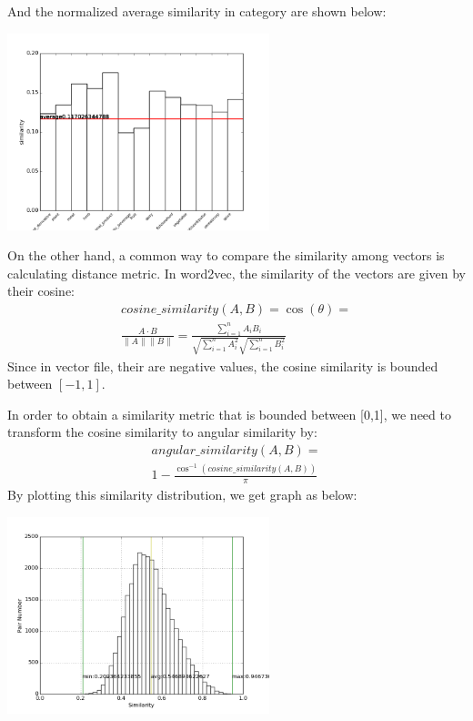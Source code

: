 \documentclass[12pt]{report}
\begin{document}
\begin{multicols}{2}
And the normalized average similarity in category are shown below:

\begin{center}
\includegraphics[width=3in]{normalized_similarity_by_category.png}
\end{center}

On the other hand, a common way to compare the similarity among vectors is calculating distance metric. In word2vec, the similarity of the vectors are given by their cosine:
\begin{equation}
\begin{split}
cosine\_similarity(A,B) = \cos(\theta) = \\
\frac{A \cdot B}{\|A\|\|B\|} = \frac{\sum_{i=1}^{n}A_iB_i}{\sqrt{\sum_{i=1}^{n}A_i^2}\sqrt{\sum_{i=1}^{n}B_i^2}}
\end{split}
\end{equation}
Since in vector file, their are negative values, the cosine similarity is bounded between $[-1,1]$. 

In order to obtain a similarity metric that is bounded between [0,1], we need to transform the cosine similarity to angular similarity by:
\begin{equation}
\begin{split}
angular\_similarity(A,B) = \\
1- \frac{\cos^{-1}(cosine\_similarity(A,B))}{\pi}
\end{split}
\end{equation}
By plotting this similarity distribution, we get graph as below:
\begin{center}
\includegraphics[width=3in]{angular_similarity_distribution.png}
\end{center}


\end{multicols}
\end{document}
